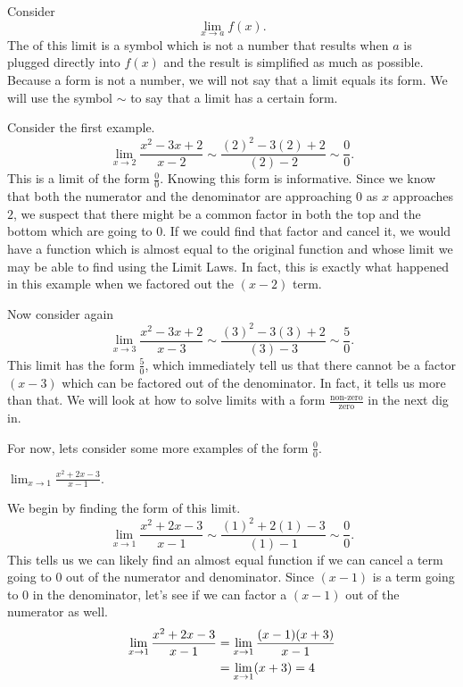 \documentclass{ximera}
\begin{document}
\begin{definition}
  Consider
  \[
  \lim_{x\to a}f(x).
  \]
  The  of this limit is a symbol which is not a number that
  results when $a$ is plugged directly into $f(x)$ and the result is
  simplified as much as possible.  Because a form is not a number, we
  will not say that a limit equals its form.  We will use the symbol
  $\sim$ to say that a limit has a certain form.
\end{definition} 

Consider the first example.
\[
\lim_{x\to 2}\frac{x^2-3x+2}{x-2} \sim \frac{(2)^2-3(2)+2}{(2)-2} \sim \frac{0}{0}.
\]
This is a limit of the form $\frac{0}{0}$.  Knowing this form is
informative.  Since we know that both the numerator and the
denominator are approaching $0$ as $x$ approaches $2$, we suspect that
there might be a common factor in both the top and the bottom which
are going to $0$.  If we could find that factor and cancel it, we would
have a function which is almost equal to the original function and
whose limit we may be able to find using the Limit Laws.  In fact,
this is exactly what happened in this example when we factored out the
$(x-2)$ term.

Now consider again
\[
\lim_{x\to 3}\frac{x^2-3x+2}{x-3} \sim \frac{(3)^2-3(3)+2}{(3)-3} \sim \frac{5}{0}.
\]
This limit has the form $\frac{5}{0}$, which immediately tell us that
there cannot be a factor $(x-3)$ which can be factored out of the
denominator.  In fact, it tells us more than that.  We will look at
how to solve limits with a form $\frac{\text{non-zero}}{\text{zero}}$
in the next dig in.

For now, lets consider some more examples of the form $\frac{0}{0}$.

\begin{example}
$\lim_{x\to1}\frac{x^2+2x-3}{x-1}$. 
\begin{explanation}
We begin by finding the form of this limit.
\[
\lim_{x\to1}\frac{x^2+2x-3}{x-1} \sim \frac{(1)^2+2(1)-3}{(1)-1} \sim
\frac{0}{0}.
\]
This tells us we can likely find an almost equal function if we can
cancel a term going to $0$ out of the numerator and denominator.  Since
$(x-1)$ is a term going to $0$ in the denominator, let's see if we can
factor a $(x-1)$ out of the numerator as well.
\begin{align*}
\lim_{x\to1}{x^2+2x-3\over x-1}&=\lim_{x\to1}{(x-1)(x+3)\over x-1} \\
&=\lim_{x\to1}(x+3)=4
\end{align*}
\end{explanation}
\end{example}
\end{document}

